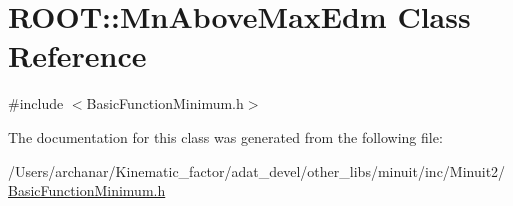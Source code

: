 \hypertarget{classROOT_1_1Minuit2_1_1BasicFunctionMinimum_1_1MnAboveMaxEdm}{}\section{R\+O\+OT\+:\+:Mn\+Above\+Max\+Edm Class Reference}
\label{classROOT_1_1Minuit2_1_1BasicFunctionMinimum_1_1MnAboveMaxEdm}


{\ttfamily \#include $<$Basic\+Function\+Minimum.\+h$>$}



The documentation for this class was generated from the following file\+:\begin{DoxyCompactItemize}
\item 
/\+Users/archanar/\+Kinematic\+\_\+factor/adat\+\_\+devel/other\+\_\+libs/minuit/inc/\+Minuit2/\mbox{\hyperlink{other__libs_2minuit_2inc_2Minuit2_2BasicFunctionMinimum_8h}{Basic\+Function\+Minimum.\+h}}\end{DoxyCompactItemize}
